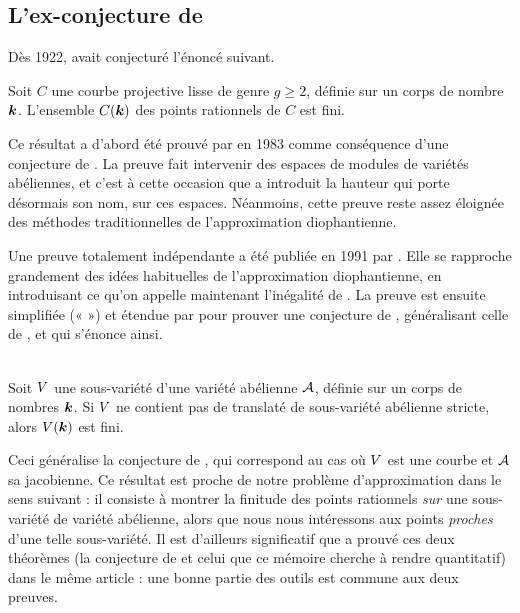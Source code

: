 
\subsection{L'ex-conjecture de }

Dès 1922,  avait conjecturé l'énoncé suivant.

\begin{thm}
  Soit \( C \) une courbe projective lisse de genre \( g \ge 2 \), définie sur
  un corps de nombre \( {\boldsymbol k} \). L'ensemble \( C({\boldsymbol k}) \) des points
  rationnels de \( C \) est fini.
\end{thm}

Ce résultat a d'abord été prouvé par  en 1983 comme conséquence
d'une conjecture de  \cite{falmor}. La preuve fait
intervenir des espaces de modules de variétés abéliennes, et c'est à cette
occasion que  a introduit la hauteur qui porte désormais son
nom, sur ces espaces. Néanmoins, cette preuve reste assez éloignée des
méthodes traditionnelles de l'approximation diophantienne.

Une preuve totalement indépendante a été publiée en 1991 par 
\cite{vojstcc}. Elle se rapproche grandement des idées habituelles de
l'approximation diophantienne, en introduisant ce qu'on appelle maintenant
l'inégalité de . La preuve est ensuite simplifiée («  ») et étendue par
 \cite{faldaav} pour prouver une conjecture de ,
généralisant celle de , et qui s'énonce ainsi.

\begin{thm}
  \label{t:fal1} ~\\
  Soit \( V \) une sous-variété d'une variété abélienne \( \mathcal A \), définie
  sur un corps de nombres \( {\boldsymbol k} \). Si \( V \) ne contient pas de
  translaté de sous-variété abélienne stricte, alors \( V({\boldsymbol k}) \) est
  fini.
\end{thm}

Ceci généralise la conjecture de , qui correspond au cas où \(
  V \) est une courbe et \( \mathcal A \) sa jacobienne. Ce résultat est proche
de notre problème d'approximation dans le sens suivant : il consiste à montrer
la finitude des points rationnels \emph{sur} une sous-variété de variété
abélienne, alors que nous nous intéressons aux points \emph{proches} d'une
telle sous-variété. Il est d'ailleurs significatif que  a prouvé
ces deux théorèmes (la conjecture de  et celui que ce
mémoire cherche à rendre quantitatif) dans le même article : une bonne partie
des outils est commune aux deux preuves.

